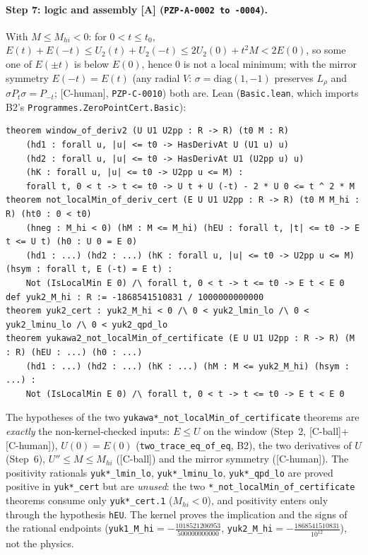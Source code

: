 \documentclass[10pt]{article}
\newcommand{\tier}[1]{\textsf{[#1]}}
\newcommand{\tA}{\tier{A}}
\newcommand{\tCh}{\tier{C-human}}
\newcommand{\tCb}{\textcolor{blue!60!black}{\textsf{[C-ball]}}}
\newcommand{\lean}[1]{\texttt{#1}}
\begin{document}
\paragraph{Step 7: logic and assembly \tA{} (\texttt{PZP-A-0002 to -0004}).} With $M\le M_{hi}<0$: for $0<t\le t_0$, $E(t)+E(-t)\le U_2(t)+U_2(-t)\le2U_2(0)+t^2M<2E(0)$, so some one of $E(\pm t)$ is below $E(0)$, hence $0$ is not a local minimum; with the mirror symmetry $E(-t)=E(t)$ (any radial $V$: $\sigma=\mathrm{diag}(1,-1)$ preserves $L_\rho$ and $\sigma P_t\sigma=P_{-t}$; \tCh{}, \texttt{PZP-C-0010}) both are. Lean (\texttt{Basic.lean}, which imports B2's \lean{Programmes.ZeroPointCert.Basic}):
\begin{lstlisting}
theorem window_of_deriv2 (U U1 U2pp : R -> R) (t0 M : R)
    (hd1 : forall u, |u| <= t0 -> HasDerivAt U (U1 u) u)
    (hd2 : forall u, |u| <= t0 -> HasDerivAt U1 (U2pp u) u)
    (hK : forall u, |u| <= t0 -> U2pp u <= M) :
    forall t, 0 < t -> t <= t0 -> U t + U (-t) - 2 * U 0 <= t ^ 2 * M
theorem not_localMin_of_deriv_cert (E U U1 U2pp : R -> R) (t0 M M_hi : R) (ht0 : 0 < t0)
    (hneg : M_hi < 0) (hM : M <= M_hi) (hEU : forall t, |t| <= t0 -> E t <= U t) (h0 : U 0 = E 0)
    (hd1 : ...) (hd2 : ...) (hK : forall u, |u| <= t0 -> U2pp u <= M) (hsym : forall t, E (-t) = E t) :
    Not (IsLocalMin E 0) /\ forall t, 0 < t -> t <= t0 -> E t < E 0
def yuk2_M_hi : R := -1868541510831 / 1000000000000
theorem yuk2_cert : yuk2_M_hi < 0 /\ 0 < yuk2_lmin_lo /\ 0 < yuk2_lminu_lo /\ 0 < yuk2_qpd_lo
theorem yukawa2_not_localMin_of_certificate (E U U1 U2pp : R -> R) (M : R) (hEU : ...) (h0 : ...)
    (hd1 : ...) (hd2 : ...) (hK : ...) (hM : M <= yuk2_M_hi) (hsym : ...) :
    Not (IsLocalMin E 0) /\ forall t, 0 < t -> t <= t0 -> E t < E 0
\end{lstlisting}
The hypotheses of the two \lean{yukawa*\_not\_localMin\_of\_certificate} theorems are \emph{exactly} the non-kernel-checked inputs: $E\le U$ on the window (Step~2, \tCb+\tCh), $U(0)=E(0)$ (\lean{two\_trace\_eq\_of\_eq}, B2), the two derivatives of $U$ (Step~6), $U''\le M\le M_{hi}$ (\tCb) and the mirror symmetry (\tCh). The positivity rationals \lean{yuk*\_lmin\_lo}, \lean{yuk*\_lminu\_lo}, \lean{yuk*\_qpd\_lo} are proved positive in \lean{yuk*\_cert} but are \emph{unused}: the two \lean{*\_not\_localMin\_of\_certificate} theorems consume only \lean{yuk*\_cert.1} ($M_{hi}<0$), and positivity enters only through the hypothesis \lean{hEU}. The kernel proves the implication and the signs of the rational endpoints (\lean{yuk1\_M\_hi}$=-\tfrac{1018521206953}{500000000000}$, \lean{yuk2\_M\_hi}$=-\tfrac{1868541510831}{10^{12}}$), not the physics.
\end{document}
